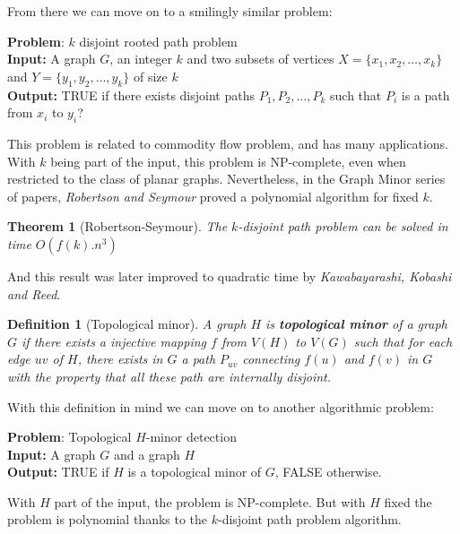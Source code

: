 \documentclass[12pt,a4paper]{article}
\newtheorem{theorem}{Theorem}
\newtheorem{definition}{Definition}
\begin{document}
\noindent From there we can move on to a smilingly similar problem:

\vspace{0.2cm}
\noindent \textbf{Problem}: $k$ disjoint rooted path problem\\
\textbf{Input:} A graph $G$, an integer $k$ and two subsets of vertices
$X=\{x_1, x_2, \ldots, x_k\}$ and $Y=\{y_1, y_2, \ldots, y_k\}$ of size $k$\\
\textbf{Output:} TRUE if there exists disjoint paths $P_1, P_2, \ldots, P_k$ such
that $P_i$ is a path from $x_i$ to $y_i$?
\vspace{0.2cm}

\noindent This problem is related to commodity flow problem, and has many
applications.  With $k$ being part of the input, this problem is NP-complete,
even when restricted to the class of planar graphs.  Nevertheless, in the Graph
Minor series of papers, \textit{Robertson and Seymour} proved a polynomial
algorithm for fixed $k$.

\begin{theorem}[Robertson-Seymour]
The $k$-disjoint path problem can be solved in time $O(f(k).n^3)$
\end{theorem}

And this result was later improved to quadratic time by \textit{ Kawabayarashi,
  Kobashi and Reed}.

\begin{definition}[Topological minor]
  A graph $H$ is \textbf{topological minor} of a graph $G$ if there exists a
  injective mapping $f$ from $V(H)$ to $V(G)$ such that for each edge $uv$ of
  $H$, there exists in $G$ a path $P_{uv}$ connecting $f(u)$ and $f(v)$ in $G$
  with the property that all these path are internally disjoint.
\end{definition}


\noindent With this definition in mind we can move on to another algorithmic
problem:

\vspace{0.2cm}
\noindent \textbf{Problem}: Topological $H$-minor detection\\
\textbf{Input:} A graph $G$ and a graph $H$\\
\textbf{Output:} TRUE if $H$ is a topological minor of $G$, FALSE otherwise.
\vspace{0.2cm}

\noindent
With $H$ part of the input, the problem is NP-complete.  But with $H$ fixed the
problem is polynomial thanks to the $k$-disjoint path problem algorithm.
\end{document}

